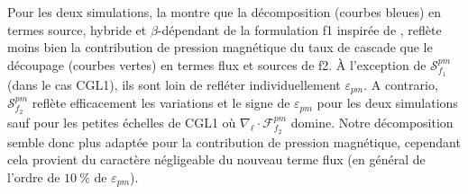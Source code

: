  Pour les deux simulations, la  montre que la décomposition (courbes bleues) en termes source, hybride et $\beta$-dépendant de la formulation f1 inspirée de , reflète moins bien la contribution de pression magnétique du taux de cascade que le découpage (courbes vertes) en termes flux et sources de f2. À l'exception de $\mathcal{S}^{pm}_{f_1}$ (dans le cas CGL1), ils sont loin de refléter individuellement $\varepsilon_{pm}$. A contrario,  $\mathcal{S}^{pm}_{f_2}$ reflète efficacement les variations et le signe de $\varepsilon_{pm}$ pour les deux simulations sauf pour les petites échelles de CGL1 où $\nabla_{\boldsymbol{\ell}} \cdot \mathcal{F}^{pm}_{f_2}$ domine. Notre décomposition semble donc plus adaptée pour la contribution de pression magnétique, cependant cela provient du caractère négligeable du nouveau terme flux (en général de l'ordre de $\SI{10}{\%}$ de $\varepsilon_{pm}$). 

